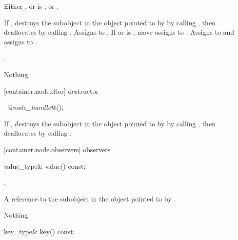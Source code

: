 \begin{itemdescr}
\pnum
\requires Either , or
is , or .

\pnum
\effects If , destroys the 
subobject in the  object pointed to by 
by calling , then deallocates  by
calling .
Assigns  to .
If  or 
is , move assigns  to . Assigns
 to  and assigns  to
.

\pnum \returns {}.

\pnum \throws Nothing.
\end{itemdescr}

[container.node.dtor]{ destructor}

\begin{itemdecl}
~@\textit{node_handle}@();
\end{itemdecl}

\begin{itemdescr}
\pnum
\effects If , destroys the  subobject
in the  object pointed to by  by calling
, then deallocates  by calling
.
\end{itemdescr}

[container.node.observers]{ observers}

\begin{itemdecl}
value_type& value() const;
\end{itemdecl}

\begin{itemdescr}
\pnum
\requires {}.

\pnum
\returns A reference to the  subobject in the
 object pointed to by .

\pnum
\throws Nothing.
\end{itemdescr}

\begin{itemdecl}
key_type& key() const;
\end{itemdecl}

